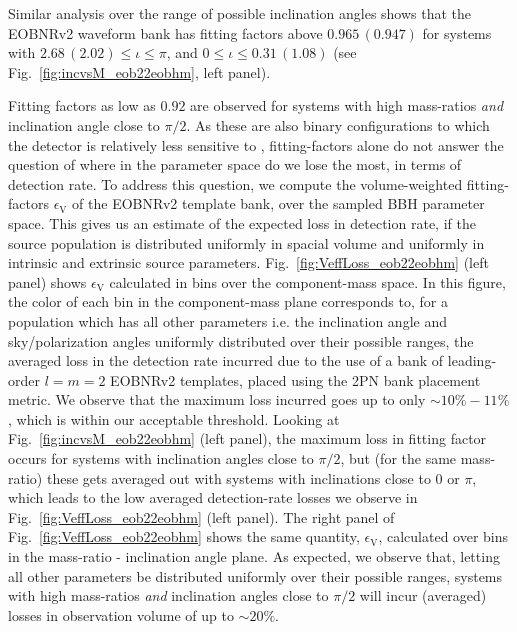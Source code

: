 Similar analysis over the range of possible inclination angles shows that the EOBNRv2 
waveform bank has fitting factors above $0.965\, (0.947)$ for systems with
$2.68\,(2.02)\leq \iota \leq \pi$, and $0\leq \iota \leq 0.31\,(1.08)$ (see 
Fig.~\ref{fig:incvsM_eob22eobhm}, left panel). 


Fitting factors as low as $0.92$ are observed for systems with high mass-ratios 
\textit{and} inclination angle close to $\pi/2$. As these are also binary 
configurations to which the detector is relatively less sensitive to \cite{Pekowsky:2012sr}, 
fitting-factors alone do not answer the question of where in the parameter 
space do we lose the most, in terms of detection rate. To address
this question, we compute the volume-weighted fitting-factors $\epsilon_{\mathrm{V}}$
of the EOBNRv2
template bank, over the sampled BBH parameter space. This gives us an estimate of
the expected loss in detection rate, if the source population is distributed 
uniformly in spacial volume and uniformly in intrinsic and extrinsic source parameters. 
Fig.~\ref{fig:VeffLoss_eob22eobhm} (left panel) shows $\epsilon_{\mathrm{V}}$ 
calculated in bins over the
component-mass space. In this figure, the color of each bin in the component-mass 
plane corresponds to, for a population which has all other parameters i.e. the
inclination angle and sky/polarization angles uniformly distributed over their 
possible ranges, the averaged loss in the detection rate incurred due to the use 
of a bank of leading-order $l=m=2$ EOBNRv2 templates, placed using the 2PN bank 
placement metric. We observe that
the maximum loss incurred goes up to only $\sim 10\% - 11\%$, which is within our
acceptable threshold. Looking at Fig.~\ref{fig:incvsM_eob22eobhm} (left panel), 
the maximum loss in fitting factor occurs for systems with inclination angles 
close to $\pi/2$, but (for the same mass-ratio) these
gets averaged out with systems with inclinations close to $0$ or $\pi$, which
leads to the low averaged detection-rate losses we observe in 
Fig.~\ref{fig:VeffLoss_eob22eobhm} (left panel). The right panel of 
Fig.~\ref{fig:VeffLoss_eob22eobhm} shows the same quantity, $\epsilon_{\mathrm{V}}$,
calculated over bins in the mass-ratio - inclination angle plane. As expected, 
we observe that, letting all other parameters be distributed uniformly over their
possible ranges, systems with high mass-ratios \textit{and} inclination angles 
close to $\pi/2$ will incur (averaged) losses in observation volume of 
up to $\sim 20\%$.

